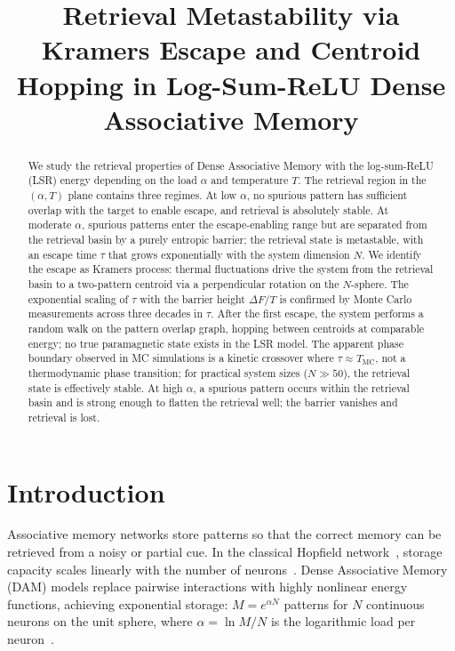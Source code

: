 \documentclass[11pt]{article}
\title{Retrieval Metastability via Kramers Escape and Centroid Hopping in Log-Sum-ReLU Dense Associative Memory}
\author{}
\date{}
\begin{document}
\maketitle

\begin{abstract}
We study the retrieval properties of Dense Associative Memory with the log-sum-ReLU (LSR) energy depending on the load $\alpha$ and temperature $T$. The retrieval region in the $(\alpha, T)$ plane contains three regimes. At low $\alpha$, no spurious pattern has sufficient overlap with the target to enable escape, and retrieval is absolutely stable. At moderate $\alpha$, spurious patterns enter the escape-enabling range but are separated from the retrieval basin by a purely entropic barrier; the retrieval state is metastable, with an escape time $\tau$ that grows exponentially with the system dimension $N$. We identify the escape as Kramers process: thermal fluctuations drive the system from the retrieval basin to a two-pattern centroid via a perpendicular rotation on the $N$-sphere. The exponential scaling of $\tau$ with the barrier height $\Delta F/T$ is confirmed by Monte Carlo measurements across three decades in $\tau$. After the first escape, the system performs a random walk on the pattern overlap graph, hopping between centroids at comparable energy; no true paramagnetic state exists in the LSR model. The apparent phase boundary observed in MC simulations is a kinetic crossover where $\tau \approx T_{\mathrm{MC}}$, not a thermodynamic phase transition; for practical system sizes ($N \gg 50$), the retrieval state is effectively stable. At high $\alpha$, a spurious pattern occurs within the retrieval basin and is strong enough to flatten the retrieval well; the barrier vanishes and retrieval is lost.
\end{abstract}

\section{Introduction}

Associative memory networks store patterns so that the correct memory can be retrieved from a noisy or partial cue.  In the classical Hopfield network~\citep{Hopfield1982}, storage capacity scales linearly with the number of neurons~\citep{amit1987statistical}.  Dense Associative Memory (DAM) models replace pairwise interactions with highly nonlinear energy functions, achieving exponential storage: $M = e^{\alpha N}$ patterns for $N$ continuous neurons on the unit sphere, where $\alpha = \ln M/N$ is the logarithmic load per neuron~\citep{demircigil2017model,ramsauer2021hopfield}.
\end{document}
